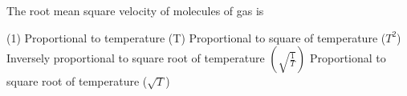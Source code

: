 \item The root mean square velocity of molecules of gas is
    \begin{tasks}(1)
        \task Proportional to temperature (T)
        \task Proportional to square of temperature (\( T^2 \))
        \task Inversely proportional to square root of temperature \(\left( \sqrt{\frac{1}{T}} \right)\)
        \task Proportional to square root of temperature (\( \sqrt{T} \))
    \end{tasks}
